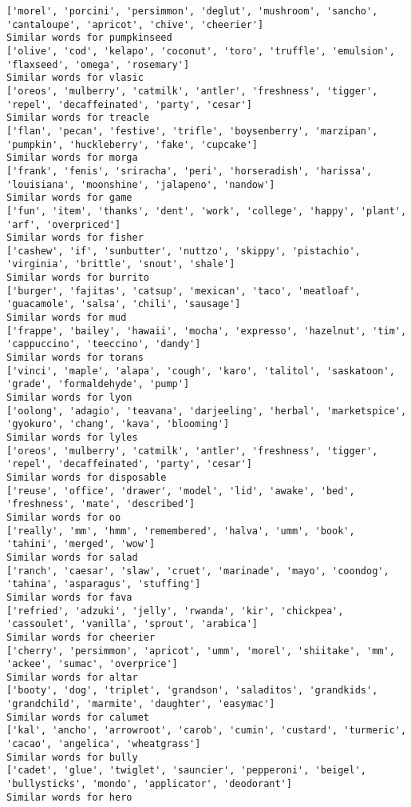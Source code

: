 \documentclass[11pt]{article}
\begin{document}
\begin{Verbatim}[commandchars=\\\{\}]
['morel', 'porcini', 'persimmon', 'deglut', 'mushroom', 'sancho', 'cantaloupe', 'apricot', 'chive', 'cheerier']
Similar words for pumpkinseed
['olive', 'cod', 'kelapo', 'coconut', 'toro', 'truffle', 'emulsion', 'flaxseed', 'omega', 'rosemary']
Similar words for vlasic
['oreos', 'mulberry', 'catmilk', 'antler', 'freshness', 'tigger', 'repel', 'decaffeinated', 'party', 'cesar']
Similar words for treacle
['flan', 'pecan', 'festive', 'trifle', 'boysenberry', 'marzipan', 'pumpkin', 'huckleberry', 'fake', 'cupcake']
Similar words for morga
['frank', 'fenis', 'sriracha', 'peri', 'horseradish', 'harissa', 'louisiana', 'moonshine', 'jalapeno', 'nandow']
Similar words for game
['fun', 'item', 'thanks', 'dent', 'work', 'college', 'happy', 'plant', 'arf', 'overpriced']
Similar words for fisher
['cashew', 'if', 'sunbutter', 'nuttzo', 'skippy', 'pistachio', 'virginia', 'brittle', 'snout', 'shale']
Similar words for burrito
['burger', 'fajitas', 'catsup', 'mexican', 'taco', 'meatloaf', 'guacamole', 'salsa', 'chili', 'sausage']
Similar words for mud
['frappe', 'bailey', 'hawaii', 'mocha', 'expresso', 'hazelnut', 'tim', 'cappuccino', 'teeccino', 'dandy']
Similar words for torans
['vinci', 'maple', 'alapa', 'cough', 'karo', 'talitol', 'saskatoon', 'grade', 'formaldehyde', 'pump']
Similar words for lyon
['oolong', 'adagio', 'teavana', 'darjeeling', 'herbal', 'marketspice', 'gyokuro', 'chang', 'kava', 'blooming']
Similar words for lyles
['oreos', 'mulberry', 'catmilk', 'antler', 'freshness', 'tigger', 'repel', 'decaffeinated', 'party', 'cesar']
Similar words for disposable
['reuse', 'office', 'drawer', 'model', 'lid', 'awake', 'bed', 'freshness', 'mate', 'described']
Similar words for oo
['really', 'mm', 'hmm', 'remembered', 'halva', 'umm', 'book', 'tahini', 'merged', 'wow']
Similar words for salad
['ranch', 'caesar', 'slaw', 'cruet', 'marinade', 'mayo', 'coondog', 'tahina', 'asparagus', 'stuffing']
Similar words for fava
['refried', 'adzuki', 'jelly', 'rwanda', 'kir', 'chickpea', 'cassoulet', 'vanilla', 'sprout', 'arabica']
Similar words for cheerier
['cherry', 'persimmon', 'apricot', 'umm', 'morel', 'shiitake', 'mm', 'ackee', 'sumac', 'overprice']
Similar words for altar
['booty', 'dog', 'triplet', 'grandson', 'saladitos', 'grandkids', 'grandchild', 'marmite', 'daughter', 'easymac']
Similar words for calumet
['kal', 'ancho', 'arrowroot', 'carob', 'cumin', 'custard', 'turmeric', 'cacao', 'angelica', 'wheatgrass']
Similar words for bully
['cadet', 'glue', 'twiglet', 'sauncier', 'pepperoni', 'beigel', 'bullysticks', 'mondo', 'applicator', 'deodorant']
Similar words for hero

\end{Verbatim}
\end{document}
